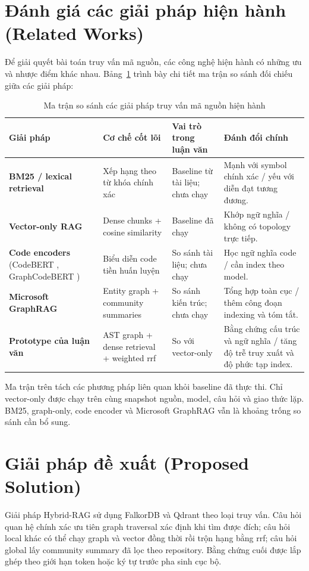 \documentclass[12pt,a4paper,oneside]{report}
\begin{document}
\section{Đánh giá các giải pháp hiện hành (Related Works)}
Để giải quyết bài toán truy vấn mã nguồn, các công nghệ hiện hành có những ưu và nhược điểm khác nhau. Bảng~\ref{tab:related_works} trình bày chi tiết ma trận so sánh đối chiếu giữa các giải pháp:

\begin{table}[H]
    \centering
    \caption{Ma trận so sánh các giải pháp truy vấn mã nguồn hiện hành}
    \label{tab:related_works}
    \small
    \begin{tabular}{p{2.5cm}p{3cm}p{3cm}p{4cm}}
        \toprule
        \textbf{Giải pháp} & \textbf{Cơ chế cốt lõi} & \textbf{Vai trò trong luận văn} & \textbf{Đánh đổi chính} \\
        \midrule
        \textbf{BM25 / lexical retrieval} \cite{bm25} & Xếp hạng theo từ khóa chính xác & Baseline từ tài liệu; chưa chạy & Mạnh với symbol chính xác / yếu với diễn đạt tương đương. \\
        \midrule
        \textbf{Vector-only RAG} \cite{lewis2020rag} & Dense chunks + cosine similarity & Baseline đã chạy & Khớp ngữ nghĩa / không có topology trực tiếp. \\
        \midrule
        \textbf{Code encoders} (CodeBERT \cite{feng2020codebert}, GraphCodeBERT \cite{guo2024graphcodebert}) & Biểu diễn code tiền huấn luyện & So sánh tài liệu; chưa chạy & Học ngữ nghĩa code / cần index theo model. \\
        \midrule
        \textbf{Microsoft GraphRAG} \cite{edge2024graphrag} & Entity graph + community summaries & So sánh kiến trúc; chưa chạy & Tổng hợp toàn cục / thêm công đoạn indexing và tóm tắt. \\
        \midrule
        \textbf{Prototype của luận văn} & AST graph + dense retrieval + weighted \gls{rrf} & So với vector-only & Bằng chứng cấu trúc và ngữ nghĩa / tăng độ trễ truy xuất và độ phức tạp index. \\
        \bottomrule
    \end{tabular}
\end{table}

Ma trận trên tách các phương pháp liên quan khỏi baseline đã thực thi. Chỉ vector-only được chạy trên cùng snapshot nguồn, model, câu hỏi và giao thức lặp. BM25, graph-only, code encoder và Microsoft GraphRAG vẫn là khoảng trống so sánh cần bổ sung.

\section{Giải pháp đề xuất (Proposed Solution)}
Giải pháp Hybrid-RAG sử dụng FalkorDB \cite{falkordb2024} và Qdrant \cite{qdrant2024} theo loại truy vấn. Câu hỏi quan hệ chính xác ưu tiên graph traversal xác định khi tìm được đích; câu hỏi local khác có thể chạy graph và vector đồng thời rồi trộn hạng bằng \gls{rrf}; câu hỏi global lấy community summary đã lọc theo repository. Bằng chứng cuối được lắp ghép theo giới hạn token hoặc ký tự trước pha sinh cục bộ.
\end{document}
